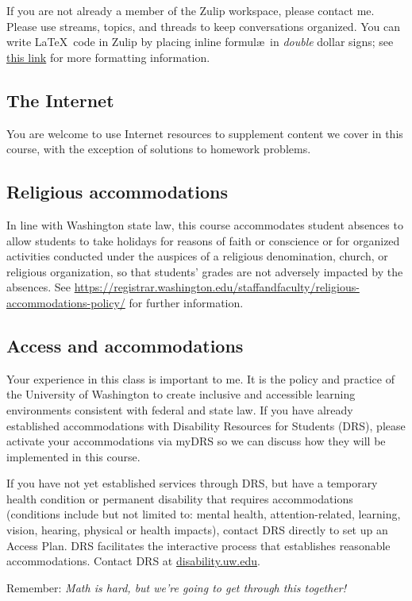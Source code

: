 \documentclass[11pt,twoside]{amsart}
\begin{document}
If you are not already a member of the Zulip workspace, please contact me. Please use streams, topics, and threads to keep conversations organized. You can write \LaTeX~code in Zulip by placing inline formul\ae~in \emph{double} dollar signs; see \href{https://zulip.com/help/format-your-message-using-markdown#latex}{this link} for more formatting information.

\subsection*{The Internet}
You are welcome to use Internet resources to supplement content we cover in this course, with the exception of solutions to homework problems.

\subsection*{Religious accommodations}
In line with Washington state law, this course accommodates student absences to allow students to take holidays for reasons of faith or conscience or for organized activities conducted under the auspices of a religious denomination, church, or religious organization, so that students’ grades are not adversely impacted by the absences. See \url{https://registrar.washington.edu/staffandfaculty/religious-accommodations-policy/} for further information.

\subsection*{Access and accommodations}
Your experience in this class is important to me. It is the policy and practice of the University of Washington to create inclusive and accessible learning environments consistent with federal and state law. If you have already established accommodations with Disability Resources for Students (DRS), please activate your accommodations via myDRS so we can discuss how they will be implemented in this course.

If you have not yet established services through DRS, but have a temporary health condition or permanent disability that requires accommodations (conditions include but not limited to: mental health, attention-related, learning, vision, hearing, physical or health impacts), contact DRS directly to set up an Access Plan. DRS facilitates the interactive process that establishes reasonable accommodations. Contact DRS at \url{disability.uw.edu}.

\bigskip \bigskip
\hrulefill
\bigskip \bigskip

\begin{center}
Remember: \emph{Math is hard, but we're going to get through this together!}
\end{center}
\end{document}

